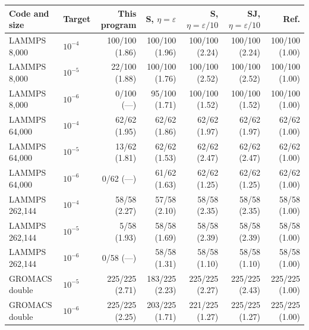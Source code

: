 \begin{tabular}{llrrrrr}
\toprule
Code and size & Target & This program & S, $\eta=\varepsilon$ & S, $\eta=\varepsilon/10$ & SJ, $\eta=\varepsilon/10$ & Ref. \\
\midrule
LAMMPS 8,000 & $10^{-4}$ & 100/100 (1.86) & 100/100 (1.96) & 100/100 (2.24) & 100/100 (2.24) & 100/100 (1.00) \\
LAMMPS 8,000 & $10^{-5}$ & 22/100 (1.88) & 100/100 (1.76) & 100/100 (2.52) & 100/100 (2.52) & 100/100 (1.00) \\
LAMMPS 8,000 & $10^{-6}$ & 0/100 (---) & 95/100 (1.71) & 100/100 (1.52) & 100/100 (1.52) & 100/100 (1.00) \\
LAMMPS 64,000 & $10^{-4}$ & 62/62 (1.95) & 62/62 (1.86) & 62/62 (1.97) & 62/62 (1.97) & 62/62 (1.00) \\
LAMMPS 64,000 & $10^{-5}$ & 13/62 (1.81) & 62/62 (1.53) & 62/62 (2.47) & 62/62 (2.47) & 62/62 (1.00) \\
LAMMPS 64,000 & $10^{-6}$ & 0/62 (---) & 61/62 (1.63) & 62/62 (1.25) & 62/62 (1.25) & 62/62 (1.00) \\
LAMMPS 262,144 & $10^{-4}$ & 58/58 (2.27) & 57/58 (2.10) & 58/58 (2.35) & 58/58 (2.35) & 58/58 (1.00) \\
LAMMPS 262,144 & $10^{-5}$ & 5/58 (1.93) & 58/58 (1.69) & 58/58 (2.39) & 58/58 (2.39) & 58/58 (1.00) \\
LAMMPS 262,144 & $10^{-6}$ & 0/58 (---) & 58/58 (1.31) & 58/58 (1.10) & 58/58 (1.10) & 58/58 (1.00) \\
GROMACS double & $10^{-5}$ & 225/225 (2.71) & 183/225 (2.23) & 225/225 (2.27) & 225/225 (2.43) & 225/225 (1.00) \\
GROMACS double & $10^{-6}$ & 225/225 (2.25) & 203/225 (1.71) & 221/225 (1.27) & 225/225 (1.27) & 225/225 (1.00) \\
\bottomrule
\end{tabular}